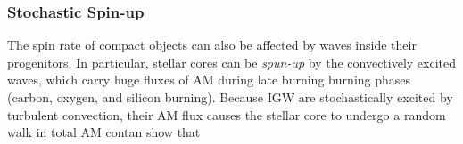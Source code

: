 \subsubsection{Stochastic Spin-up}

The spin rate of compact objects can also be affected by waves inside their progenitors. In particular, stellar cores can be {\it spun-up} by the convectively excited waves, which carry huge fluxes of AM during late burning burning phases (carbon, oxygen, and silicon burning). Because IGW are stochastically excited by turbulent convection, their AM flux causes the stellar core to undergo a random walk in total AM contan \cite{fullerwave:14} show that 

